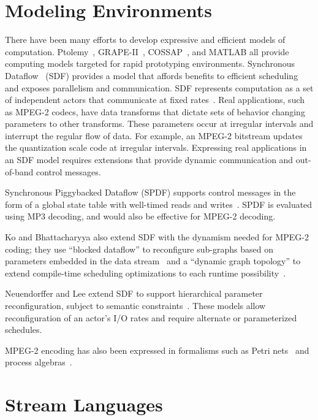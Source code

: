 \section{Modeling Environments}
\label{section:related_modeling}
There have been many efforts to develop expressive and efficient
models of computation. Ptolemy~\cite{ptolemy03overview}, GRAPE-II~\cite{grape-ii}, 
COSSAP~\cite{cossap}, and MATLAB all 
provide computing models targeted for rapid prototyping environments. 
Synchronous Dataflow~\cite{lee87static} (SDF) provides a model 
that affords benefits to efficient scheduling and 
exposes parallelism and communication. SDF represents
computation as a set of independent actors that communicate at fixed
rates~\cite{lee87static}. Real applications, such as MPEG-2 codecs,
have data transforms that dictate sets of behavior changing parameters
to other transforms. These parameters occur at irregular intervals
and interrupt the regular flow of data. For example, an MPEG-2 bitstream
updates the quantization scale code at irregular intervals.
Expressing real applications
in an SDF model requires extensions that provide dynamic communication
and out-of-band control messages. 

Synchronous Piggybacked Dataflow
(SPDF) supports control messages in the form of a global state table
with well-timed reads and writes~\cite{park99spdf2,park02spdf3}.  SPDF
is evaluated using MP3 decoding, and would also be effective for
MPEG-2 decoding.  

Ko and Bhattacharyya also extend SDF with the dynamism needed for
MPEG-2 coding; they use ``blocked dataflow'' to reconfigure
sub-graphs based on parameters embedded in the data
stream~\cite{bhatta05block} and a ``dynamic graph topology'' to extend
compile-time scheduling optimizations to each runtime
possibility~\cite{ko05dgt}. 

Neuendorffer and Lee extend SDF to
support hierarchical parameter reconfiguration, subject to semantic
constraints~\cite{neuendorffer04hierarchical}.  
These models allow reconfiguration of an actor's I/O
rates and require alternate or parameterized schedules. 

MPEG-2 encoding has also been expressed in formalisms such as Petri
nets~\cite{valero02petri} and process algebras~\cite{pelayo01rosa}.

\section{Stream Languages}

